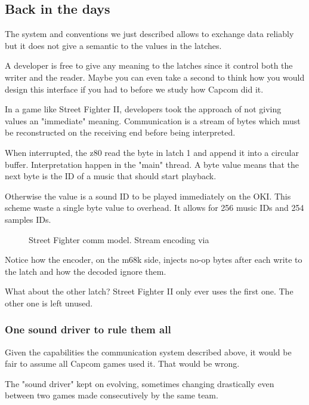 \subsection{Back in the days}
The system and conventions we just described allows to exchange data reliably but it does not give a semantic to the values in the latches. 

A developer is free to give any meaning to the latches since it control both the writer and the reader. Maybe you can even take a second to think how you would design this interface if you had to before we study how Capcom did it.

In a game like Street Fighter II, developers took the approach of not giving values an "immediate" meaning. Communication is a stream of bytes which must be reconstructed on the receiving end before being interpreted.



When interrupted, the z80 read the byte in latch 1 and append it into a circular buffer. Interpretation happen in the "main" thread. A byte value  means that the next byte is the ID of a music that should start playback. 

Otherwise the value is a sound ID to be played immediately on the OKI. This scheme waste a single byte value to overhead. It allows for 256 music IDs and 254 samples IDs.

 \begin{figure}[H]
\caption*{Street Fighter comm model. Stream encoding via }
\end{figure}

Notice how the encoder, on the m68k side, injects  no-op bytes after each write to the latch and how the decoded ignore them.

What about the other latch? Street Fighter II only ever uses the first one. The other one is left unused.

\subsubsection{One sound driver to rule them all}

Given the capabilities the communication system described above, it would be fair to assume all Capcom games used it. That would be wrong.

The "sound driver" kept on evolving, sometimes changing drastically even between two games made consecutively by the same team. 

